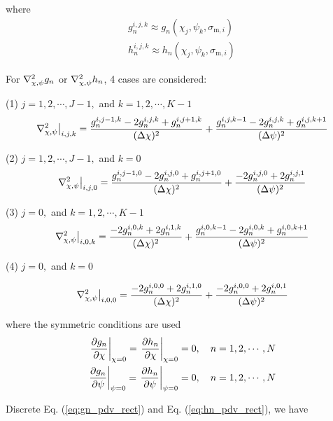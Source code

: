 \documentclass{article}
\begin{document}
where
\begin{align}
	g_n^{i,j,k} \approx g_n(\chi_j,\psi_k,\sigma_{\mathrm{m},i}) \nonumber \\
	h_n^{i,j,k} \approx h_n(\chi_j,\psi_k,\sigma_{\mathrm{m},i}) 
\end{align}

For $\laplacian_{\chi,\psi} g_n$ or $\laplacian_{\chi,\psi} h_n$, 4 cases
are considered:

(1) $j = 1,2,\cdots,J-1,$ and $k = 1,2,\cdots,K-1$
\begin{align}
	\left. \laplacian_{\chi,\psi}\right|_{i,j,k}
	= \frac{g_n^{i,j-1,k} - 2g_n^{i,j,k} + g_n^{i,j+1,k}}{(\Delta \chi)^2}
	+ \frac{g_n^{i,j,k-1} - 2g_n^{i,j,k} + g_n^{i,j,k+1}}{(\Delta \psi)^2}
\end{align}

(2) $j = 1,2,\cdots,J-1,$ and $k = 0$
\begin{align}
	\left. \laplacian_{\chi,\psi}\right|_{i,j,0}
	= \frac{g_n^{i,j-1,0} - 2g_n^{i,j,0} + g_n^{i,j+1,0}}{(\Delta \chi)^2}
	+ \frac{-2g_n^{i,j,0} + 2g_n^{i,j,1}}{(\Delta \psi)^2}
\end{align}

(3) $j = 0,$ and $k = 1,2,\cdots,K-1$
\begin{align}
	\left. \laplacian_{\chi,\psi}\right|_{i,0,k}
	= \frac{-2g_n^{i,0,k} + 2g_n^{i,1,k}}{(\Delta \chi)^2}
	+ \frac{g_n^{i,0,k-1} - 2g_n^{i,0,k} + g_n^{i,0,k+1}}{(\Delta \psi)^2}
\end{align}

(4) $j = 0,$ and $k =0$

\begin{align}
	\left. \laplacian_{\chi,\psi}\right|_{i,0,0}
	= \frac{-2g_n^{i,0,0} + 2g_n^{i,1,0}}{(\Delta \chi)^2}
	+ \frac{-2g_n^{i,0,0} + 2g_n^{i,0,1}}{(\Delta \psi)^2}
\end{align}

where the symmetric conditions are used
\begin{align}
	\left.\pdv{g_n}{\chi}\right|_{\chi=0} = \left.\pdv{h_n}{\chi}\right|_{\chi=0} = 0\qc n= 1,2,\cdots,N\nonumber\\
	\left. \pdv{g_n}{\psi}\right|_{\psi=0} = \left. \pdv{h_n}{\psi}\right|_{\psi=0} = 0\qc n= 1,2,\cdots,N
\end{align}


Discrete Eq. (\ref{eq:gn_pdv_rect}) and Eq. (\ref{eq:hn_pdv_rect}), we have
\end{document}
